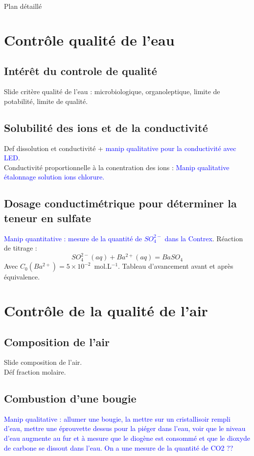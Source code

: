 \begin{reportBlock}{Plan détaillé}
\section{Contrôle qualité de l'eau}
\subsection{Intérêt du controle de qualité}

Slide critère qualité de l'eau : microbiologique, organoleptique, limite de potabilité, limite de qualité.

\subsection{Solubilité des ions et de la conductivité}
Def dissolution et conductivité + \textcolor{blue}{manip qualitative pour la conductivité avec LED}.\\

Conductivité proportionnelle à la conentration des ions : \textcolor{blue}{Manip qualitative étalonnage solution ions chlorure.}\\

\subsection{Dosage conductimétrique pour déterminer la teneur en sulfate}
\textcolor{blue}{Manip quantitative : mesure de la quantité de $SO_4^{2-}$ dans la Contrex}. Réaction de titrage :
\begin{equation}
    SO_4^{2-}(aq) + Ba^{2+}(aq) = BaSO_4
\end{equation}
Avec $C_0(Ba^{2+})=5\times10^{-2}$~mol.L$^{-1}$. Tableau d'avancement avant et après équivalence.

\section{Contrôle de la qualité de l'air}

\subsection{Composition de l'air}
Slide composition de l'air.\\

Déf fraction molaire.

\subsection{Combustion d'une bougie}
\textcolor{blue}{Manip qualitative : allumer une bougie, la mettre sur un cristallisoir rempli d'eau, mettre une éprouvette dessus pour la piéger dans l'eau, voir que le niveau d'eau augmente au fur et à mesure que le diogène est consommé et que le dioxyde de carbone se dissout dans l'eau. On a une mesure de la quantité de CO2 ??}

\end{reportBlock}

